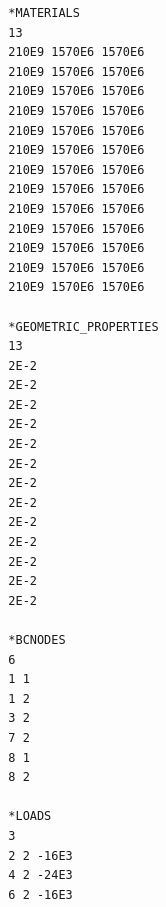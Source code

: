 \documentclass[paper=a4, fontsize=11pt]{scrartcl}
\begin{document}
\begin{appendices}
\begin{lstlisting}
  *MATERIALS
  13
  210E9 1570E6 1570E6
  210E9 1570E6 1570E6
  210E9 1570E6 1570E6
  210E9 1570E6 1570E6
  210E9 1570E6 1570E6
  210E9 1570E6 1570E6
  210E9 1570E6 1570E6
  210E9 1570E6 1570E6
  210E9 1570E6 1570E6
  210E9 1570E6 1570E6
  210E9 1570E6 1570E6
  210E9 1570E6 1570E6
  210E9 1570E6 1570E6

  *GEOMETRIC_PROPERTIES
  13
  2E-2
  2E-2
  2E-2
  2E-2
  2E-2
  2E-2
  2E-2
  2E-2
  2E-2
  2E-2
  2E-2
  2E-2
  2E-2

  *BCNODES
  6
  1 1
  1 2
  3 2
  7 2
  8 1
  8 2

  *LOADS
  3
  2 2 -16E3
  4 2 -24E3
  6 2 -16E3
    \end{lstlisting}
\end{appendices}

\end{document}
